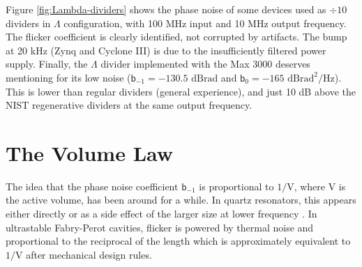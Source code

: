 \documentclass{article}
\newcommand{\unit}[1]{\ensuremath{\mathrm{#1}}}
\newcommand{\ohm}{\ensuremath{\mathrm{\Omega}}}
\begin{document}
Figure \ref{fig:Lambda-dividers} shows the phase noise of some devices used as $\div10$ dividers in $\Lambda$ configuration, with 100 MHz input and 10 MHz output frequency.  The flicker coefficient is clearly identified, not corrupted by artifacts.  The bump at 20 kHz (Zynq and Cyclone III) is due to the insufficiently filtered power supply.  Finally, the $\Lambda$ divider implemented with the Max 3000 deserves mentioning for its low noise ($\mathsf{b}_{-1}=-130.5$ \unit{dBrad} and $\mathsf{b}_{0}=-165$ \unit{dBrad^2/Hz}).  This is lower than regular dividers (general experience), and just 10 dB above the NIST regenerative dividers \cite{Hati-2013} at the same output frequency.













\section{The Volume Law}\label{sec:Volume-law}
The idea that the phase noise coefficient $\mathsf{b}_{-1}$ is proportional to $1/\mathrm{V}$, where $\mathrm{V}$ is the active volume, has been around for a while. 
In quartz resonators, this appears either directly or as a side effect of the larger size at lower frequency \cite{Kroupa-1988,Kroupa-2005,vanderZiel-1988,Walls-1992,Driscoll-1993,Sthal-2013}.  
In ultrastable Fabry-Perot cavities, flicker is powered by thermal noise and proportional to the reciprocal of the length \cite{Saulson-1990,Numata-2004} which is approximately equivalent to $1/\mathrm{V}$ after mechanical design rules.
\end{document}
